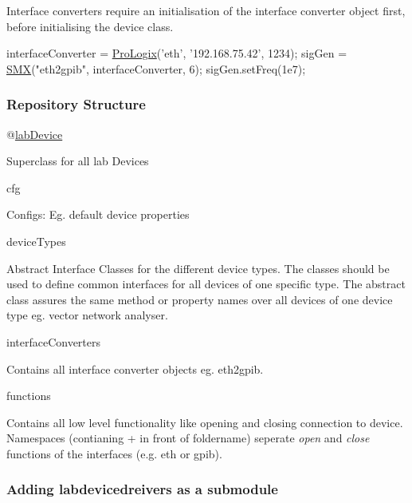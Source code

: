Interface converters require an initialisation of the interface converter object first, before initialising the device class. 
\begin{DoxyCode}
interfaceConverter = \hyperlink{class_pro_logix}{ProLogix}(\textcolor{stringliteral}{'eth'},%
                              \textcolor{stringliteral}{'192.168.75.42'},%
                              1234); %
sigGen = \hyperlink{class_s_m_x}{SMX}(\textcolor{stringliteral}{"eth2gpib"},%
             interfaceConverter,%
             6); %
sigGen.setFreq(1e7);
\end{DoxyCode}


\subsubsection*{Repository Structure}


\begin{DoxyCode}
@\hyperlink{classlab_device}{labDevice} 
\end{DoxyCode}
 Superclass for all lab Devices 
\begin{DoxyCode}
cfg 
\end{DoxyCode}
 Configs\+: Eg. default device properties 
\begin{DoxyCode}
deviceTypes 
\end{DoxyCode}
 Abstract Interface Classes for the different device types. The classes should be used to define common interfaces for all devices of one specific type. The abstract class assures the same method or property names over all devices of one device type eg. vector network analyser. 
\begin{DoxyCode}
interfaceConverters 
\end{DoxyCode}
 Contains all interface converter objects eg. eth2gpib. 
\begin{DoxyCode}
functions 
\end{DoxyCode}
 Contains all low level functionality like opening and closing connection to device. Namespaces (contianing + in front of foldername) seperate {\itshape open} and {\itshape close} functions of the interfaces (e.\+g. eth or gpib).

\subsubsection*{Adding labdevicedreivers as a submodule}

